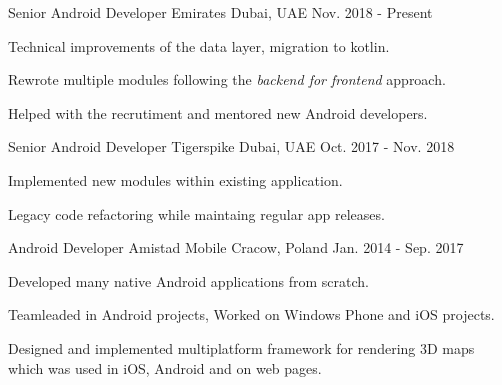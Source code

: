

\begin{cventries}

  \cventry
    {Senior Android Developer} %
    {Emirates} %
    {Dubai, UAE} %
    {Nov. 2018 - Present} %
    {
      \begin{cvitems} %
        \item {Technical improvements of the data layer, migration to kotlin.}
\item {Rewrote multiple modules following the \textit{backend for frontend} approach.}
        \item {Helped with the recrutiment and mentored new Android developers.}
      \end{cvitems}
    }

  \cventry
    {Senior Android Developer} %
    {Tigerspike} %
    {Dubai, UAE} %
    {Oct. 2017 - Nov. 2018} %
    {
      \begin{cvitems} %
        \item {Implemented new modules within existing application.}
        \item {Legacy code refactoring while maintaing regular app releases.}
      \end{cvitems}
    }

  \cventry
    {Android Developer} %
    {Amistad Mobile} %
    {Cracow, Poland} %
    {Jan. 2014 - Sep. 2017} %
    {
      \begin{cvitems} %
        \item {Developed many native Android applications from scratch.}
        \item {Teamleaded in Android projects, Worked on Windows Phone and iOS projects.}
        \item {Designed and implemented multiplatform framework for rendering 3D maps which was used in iOS, Android and on web pages.}
      \end{cvitems}
    }


\end{cventries}
